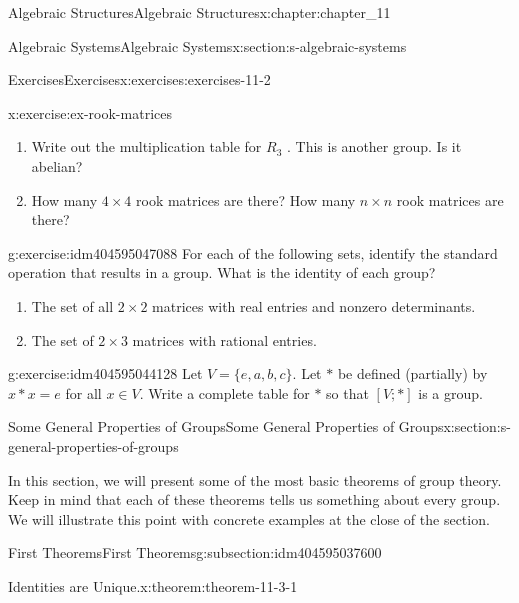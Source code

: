 \documentclass[twoside,10pt,]{book}
\numberwithin{equation}{section}
\begin{document}
\begin{chapterptx}{Algebraic Structures}{}{Algebraic Structures}{}{}{x:chapter:chapter_11}
\begin{sectionptx}{Algebraic Systems}{}{Algebraic Systems}{}{}{x:section:s-algebraic-systems}
\begin{exercises-subsection}{Exercises}{}{Exercises}{}{}{x:exercises:exercises-11-2}
\begin{divisionexercise}{5}{}{}{x:exercise:ex-rook-matrices}
\begin{enumerate}[label=(\alph*)]
\item{}Write out the multiplication table for \(R_3\) . This is another group. Is it abelian?%
\item{}How many \(4\times 4\) rook matrices are there? How many \(n\times  n\) rook matrices are there?%
\end{enumerate}
%
\end{divisionexercise}%
\begin{divisionexercise}{6}{}{}{g:exercise:idm404595047088}%
For each of the following sets, identify the standard operation that results in a group. What is the identity of each group?%
\begin{enumerate}[label=(\alph*)]
\item{}The set of all \(2\times 2\) matrices with real entries and nonzero determinants.%
\item{}The set of \(2 \times  3\) matrices with rational entries.%
\end{enumerate}
%
\end{divisionexercise}%
\begin{divisionexercise}{7}{}{}{g:exercise:idm404595044128}%
Let \(V = \{e,a,b, c\}\).  Let \(*\) be defined (partially) by \(x * x = e\) for all \(x \in  V\). Write a complete table for \(*\) so that \([V; * ]\) is a group.%
\end{divisionexercise}%
\end{exercises-subsection}
\end{sectionptx}
%
%
\typeout{************************************************}
\typeout{************************************************}
%
\begin{sectionptx}{Some General Properties of Groups}{}{Some General Properties of Groups}{}{}{x:section:s-general-properties-of-groups}
%
\begin{introduction}{}%
In this section, we will present some of the most basic theorems of group theory. Keep in mind that each of these theorems tells us something about every group. We will illustrate this point with concrete examples at the close of the section.%
\end{introduction}%
%
%
\typeout{************************************************}
\typeout{************************************************}
%
\begin{subsectionptx}{First Theorems}{}{First Theorems}{}{}{g:subsection:idm404595037600}
\begin{theorem}{Identities are Unique.}{}{x:theorem:theorem-11-3-1}%

\end{theorem}
\end{subsectionptx}
\end{sectionptx}
\end{chapterptx}
\end{document}
